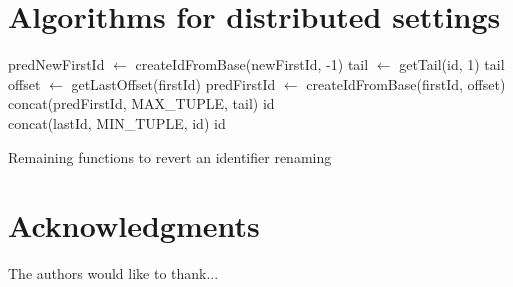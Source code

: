 \documentclass[10pt,journal,compsoc]{IEEEtran}
\let\MYoriglatexcaption\caption
\renewcommand{\caption}[2][\relax]{\MYoriglatexcaption[#2]{#2}}
\begin{document}
\section{Algorithms for distributed settings}

\label{app:revert-rename-id}

\begin{myalgorithm}[h!]
    \begin{algorithmic}
            \State predNewFirstId $\gets$ createIdFromBase(newFirstId, -1)
                \State tail $\gets$ getTail(id, 1)
                    \State \Return tail
                \Else
                    \State offset $\gets$ getLastOffset(firstId)
                    \State predFirstId $\gets$ createIdFromBase(firstId, offset)
                    \State \Return concat(predFirstId, MAX\_TUPLE, tail)
                \EndIf
            \Else
                \State \Return id
            \EndIf
        \EndFunction
        \\
                \State \Return concat(lastId, MIN\_TUPLE, id)
            \Else
                \State \Return id
            \EndIf
        \EndFunction
    \end{algorithmic}
    \caption{Remaining functions to revert an identifier renaming}
\end{myalgorithm}

\section*{Acknowledgments}

The authors would like to thank...


\ifCLASSOPTIONcaptionsoff
  \newpage
\fi



\end{document}
